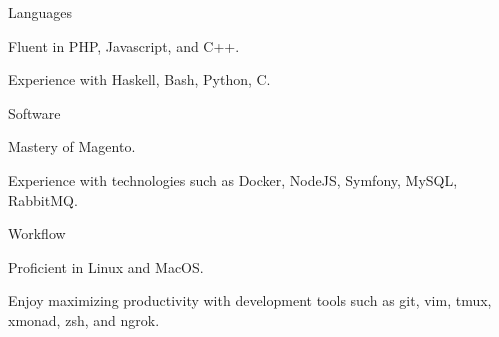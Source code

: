 \begin{cvskills}
  \cvskill
    {Languages}
    {
      \begin{cvitems}
        \item Fluent in PHP, Javascript, and C++.
        \item Experience with Haskell, Bash, Python, C.
      \end{cvitems}
    }
  \cvskill
    {Software}
    {
      \begin{cvitems}
        \item Mastery of Magento.
        \item Experience with technologies such as Docker, NodeJS, Symfony, MySQL, RabbitMQ.
      \end{cvitems}
    }
  \cvskill
    {Workflow}
    {
      \begin{cvitems}
        \item Proficient in Linux and MacOS.
        \item Enjoy maximizing productivity with development tools such as git, vim, tmux, xmonad, zsh, and ngrok.
      \end{cvitems}
    }
\end{cvskills}
